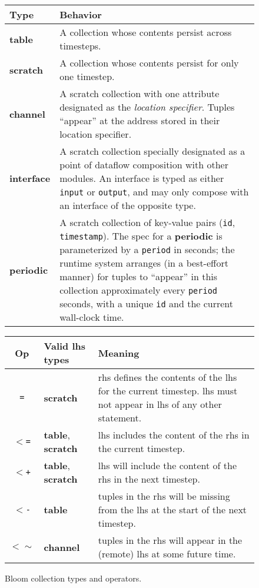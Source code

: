\begin{figure}
	\begin{small}
	\begin{tabular}{|l|p{2.55in}|}
		\hline
		Type & Behavior\\
		\hline
		\textbf{table} & A collection whose contents persist across timesteps.\\
		\textbf{scratch} & A collection whose contents persist for only one timestep.\\
		\textbf{channel} & A scratch collection with one attribute designated as the {\em location specifier}. Tuples ``appear'' at the address stored in their location specifier.\\
    \textbf{interface} & A scratch collection specially designated as a point of dataflow composition with other modules.  An interface is typed as either \texttt{input} or \texttt{output}, and may only compose with an interface of the opposite type.\\
		\textbf{periodic} & A scratch collection of key-value pairs (\texttt{id}, \texttt{timestamp}).  The spec for a \textbf{periodic} is parameterized by a \texttt{period} in seconds; the runtime system arranges (in a best-effort manner) for tuples to ``appear'' in this collection approximately every \texttt{period} seconds, with a unique \texttt{id} and the current wall-clock time.\\
		\hline
	\end{tabular}

	\vspace{2em}
	
	\begin{tabular}{|c|l|p{2in}|}
		\hline
		Op & Valid lhs types & Meaning\\
				\hline 
		\texttt{=} & \textbf{scratch} & rhs defines the contents of the lhs for the current timestep.  lhs must not appear in lhs of any other statement.\\
		\texttt{$<$=} & \textbf{table}, \textbf{scratch} & lhs includes the content of the rhs in the current timestep.\\
		\texttt{$<$+} & \textbf{table}, \textbf{scratch} & lhs will include the content of the rhs in the next timestep.\\
		\texttt{$<$-} & \textbf{table} & tuples in the rhs will be missing from the lhs at the start of  the next timestep.\\
		\texttt{$<\sim$} & \textbf{channel} & tuples in the rhs will appear in the (remote) lhs at some future time.\\
		\hline
	\end{tabular}
	\end{small}
	\caption{Bloom collection types and operators.}
	\label{tab:bloom}
\end{figure}

